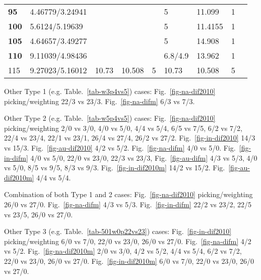 \begin{table*}
\begin{tabular}{|l|l|l|l|l|l|l|l|l|l}
\textbf{95} & 4.46779/3.24941 & \multicolumn{3}{l|}{} & 5 & 11.099 & 1 & \multicolumn{2}{l|}{} \\ \cline{1-2} \cline{6-8}
\textbf{100} & 5.6124/5.19639 & \multicolumn{3}{l|}{} & 5 & 11.4155 & 1 & \multicolumn{2}{l|}{} \\ \cline{1-2} \cline{6-8}
\textbf{105} & 4.64657/3.49277 & \multicolumn{3}{l|}{} & 5 & 14.908 & 1 & \multicolumn{2}{l|}{} \\ \cline{1-2} \cline{6-8}
\textbf{110} & 9.11039/4.98436 & \multicolumn{3}{l|}{} & 6.8/4.9 & 13.962 & 1 & \multicolumn{2}{l|}{} \\ \cline{1-8}
115 & 9.27023/5.16012 & 10.73 & 10.508 & 5 & 10.73 & 10.508 & 5 & \multicolumn{2}{l|}{} \\ \cline{1-8}
\end{tabular}
\end{table*}

Other Type 1 (e.g. Table.~\ref{tab-w3p4vs5}) cases: Fig.~\ref{fig-na-dif2010}
picking/weighting 22/3 vs 23/3. Fig.~\ref{fig-na-difm} 6/3 vs 7/3.

Other Type 2 (e.g. Table.~\ref{tab-w5p4vs5}) cases: Fig.~\ref{fig-na-dif2010}
picking/weighting 2/0 vs 3/0, 4/0 vs
5/0, 4/4 vs 5/4, 6/5 vs 7/5, 6/2 vs 7/2,
22/4 vs 23/4, 22/1 vs 23/1, 26/4 vs 27/4, 26/2 vs 27/2.
Fig.~\ref{fig-in-dif2010} 14/3 vs 15/3. Fig.~\ref{fig-au-dif2010} 4/2 vs 5/2.
Fig.~\ref{fig-na-difm} 4/0 vs 5/0.
Fig.~\ref{fig-in-difm} 4/0 vs 5/0, 22/0 vs
23/0, 22/3 vs 23/3, Fig.~\ref{fig-au-difm}
4/3 vs 5/3, 4/0 vs 5/0, 8/5 vs 9/5, 8/3 vs 9/3. Fig.~\ref{fig-in-dif2010m}
14/2 vs 15/2. Fig.~\ref{fig-au-dif2010m} 4/4 vs 5/4.

Combination of both Type 1 and 2 cases: Fig.~\ref{fig-na-dif2010}
picking/weighting 26/0 vs 27/0. Fig.~\ref{fig-na-difm}
4/3 vs 5/3. Fig.~\ref{fig-in-difm} 22/2 vs 23/2, 22/5 vs 23/5, 26/0
vs 27/0.

Other Type 3 (e.g. Table.~\ref{tab-501w0p22vs23}) cases: Fig.~\ref{fig-in-dif2010}
picking/weighting 6/0 vs 7/0, 22/0 vs
23/0, 26/0 vs 27/0. Fig.~\ref{fig-na-difm}
4/2 vs 5/2. Fig.~\ref{fig-na-dif2010m} 2/0
vs 3/0, 4/2 vs 5/2, 4/4 vs 5/4, 6/2 vs 7/2, 22/0 vs
23/0, 26/0 vs 27/0.
Fig.~\ref{fig-in-dif2010m} 6/0 vs 7/0, 22/0
vs 23/0, 26/0 vs 27/0.



